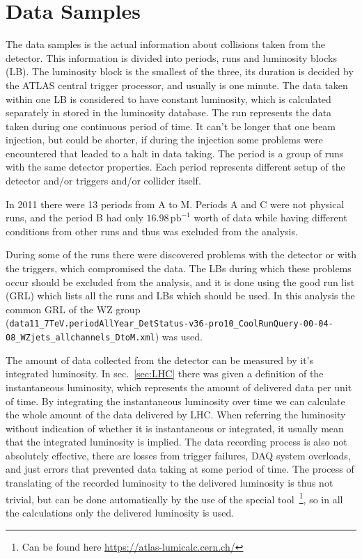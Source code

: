 \chapter{Data Samples}
\label{sec:DataSamples}

The data samples is the actual information about collisions taken from the detector. This information is divided into periods, runs and luminosity blocks (LB). The luminosity block is the smallest of the three, its duration is decided by the ATLAS central trigger processor, and usually is one minute. The data taken within one LB is considered to have constant luminosity, which is calculated separately in stored in the luminosity database. The run represents the data taken during one continuous period of time. It can't be longer that one beam injection, but could be shorter, if during the injection some problems were encountered that leaded to a halt in data taking. The period is a group of runs with the same detector properties. Each period represents different setup of the detector and/or triggers and/or collider itself.

In 2011 there were 13 periods from A to M. Periods A and C were not physical runs, and the period B had only \ensuremath{16.98\,\mathrm{pb}^{-1}} worth of data while having different conditions from other runs and thus was excluded from the analysis.

During some of the runs there were discovered problems with the detector or with the triggers, which compromised the data. The LBs during which these problems occur should be excluded from the analysis, and it is done using the good run list (GRL) which lists all the runs and LBs which should be used. In this analysis the common GRL of the WZ group\\
(\texttt{\footnotesize data11\_7TeV.periodAllYear\_DetStatus-v36-pro10\_CoolRunQuery-00-04-08\_WZjets\_allchannels\_DtoM.xml}) was used.

The amount of data collected from the detector can be measured by it's integrated luminosity. In sec.~\ref{sec:LHC} there was given a definition of the instantaneous luminosity, which represents the amount of delivered data per unit of time. By integrating the instantaneous luminosity over time we can calculate the whole amount of the data delivered by LHC. When referring the luminosity without indication of whether it is instantaneous or integrated, it usually mean that the integrated luminosity is implied. The data recording process is also not absolutely effective, there are losses from trigger failures, DAQ system overloads, and just errors that prevented data taking at some period of time. The process of translating of the recorded luminosity to the delivered luminosity is thus not trivial, but can be done automatically by the use of the special tool~\footnote{Can be found here \url{https://atlas-lumicalc.cern.ch/}}, so in all the calculations only the delivered luminosity is used.

